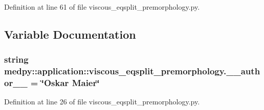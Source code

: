Definition at line 61 of file viscous\_\-eqsplit\_\-premorphology.py.



\subsection{Variable Documentation}
\hypertarget{namespacemedpy_1_1application_1_1viscous__eqsplit__premorphology_a302bbcec463f170359831872cd86fc65}{
\subsubsection[{\_\-\_\-author\_\-\_\-}]{\setlength{\rightskip}{0pt plus 5cm}string {\bf medpy::application::viscous\_\-eqsplit\_\-premorphology.\_\-\_\-author\_\-\_\-} = \char`\"{}Oskar Maier\char`\"{}}}
\label{namespacemedpy_1_1application_1_1viscous__eqsplit__premorphology_a302bbcec463f170359831872cd86fc65}


Definition at line 26 of file viscous\_\-eqsplit\_\-premorphology.py.

